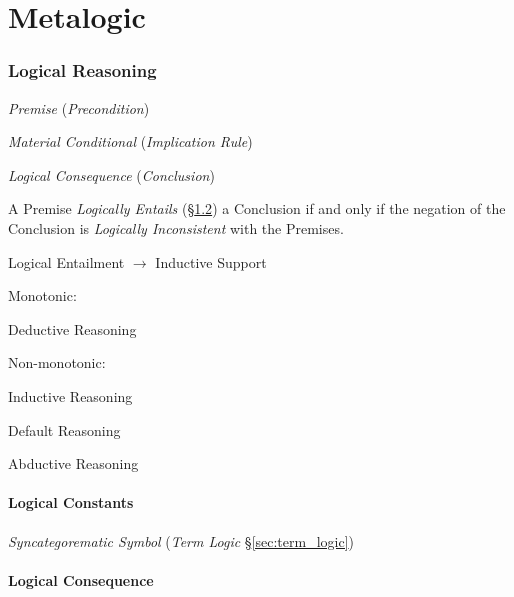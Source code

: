\part{Metalogic}\label{sec:metalogic}

\section{Logical Reasoning}\label{sec:logical_reasoning}

\emph{Premise} (\emph{Precondition})

\emph{Material Conditional} (\emph{Implication Rule})

\emph{Logical Consequence} (\emph{Conclusion})

A Premise \emph{Logically Entails} (\S\ref{sec:logical_consequence}) a
Conclusion if and only if the negation of the Conclusion is
\emph{Logically Inconsistent} with the Premises.

Logical Entailment $\rightarrow$ Inductive Support

Monotonic:

    Deductive Reasoning

Non-monotonic:

    Inductive Reasoning

    Default Reasoning

    Abductive Reasoning



\subsection{Logical Constants}\label{sec:logical_constant}

\emph{Syncategorematic Symbol} (\emph{Term Logic} \S\ref{sec:term_logic})



\subsection{Logical Consequence}\label{sec:logical_consequence}
\cite{beall-restall05}

